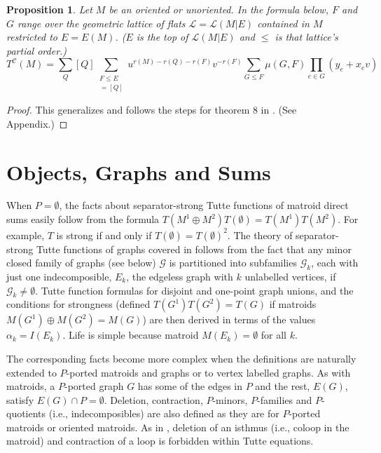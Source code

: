 \documentclass[12pt,leqno]{amsart}
\newtheorem{prop}[lem]{Proposition}
\theoremstyle{remark}
\begin{document}
\begin{prop}
\label{GFlatProp}
Let $M$ be an oriented or unoriented.
In the formula below,
$F$ and $G$ range over the geometric lattice of flats 
$\mathcal{L}=\mathcal{L}(M|E)$ contained
in $M$ restricted to $E = E(M)$.  
($E$ is the top of $\mathcal{L}(M|E)$ and $\le$
is that lattice's partial order.)
\[
T^{\mathcal{C}}(M) = \sum_{Q} [Q]
      \sum_{\substack{F\leq E\\
                     [M/F|P]=[Q]
           }}
                   u^{r(M)-r(Q)-r(F)}
                   v^{-r(F)}
                   \sum_{G\le F}
                   \mu(G,F)
                   \prod_{e\in G}
                    (y_e+x_ev)
\]
\end{prop}

\begin{proof}
This 
generalizes and 
follows the steps for theorem 8 in \cite{sdcPorted}.  (See Appendix.)
\end{proof}

\part{Objects, Graphs and Sums}


When $P=\emptyset$, the facts about separator-strong Tutte functions
of matroid direct sums easily follow from the formula
$T(M^1\oplus M^2)T(\emptyset)=T(M^1)T(M^2)$.  For example,
$T$ is strong if and only if $T(\emptyset)=T(\emptyset)^2$.
The theory of separator-strong Tutte functions of graphs covered
in \cite{Ellis-Monaghan-Traldi}  follows from the fact that any
minor closed family of graphs (see below) $\mathcal{G}$ is partitioned into
subfamilies $\mathcal{G}_k$, each with just one indecomposible,
$E_k$, the edgeless graph with $k$ unlabelled vertices, 
if $\mathcal{G}_k\neq\emptyset$.
Tutte function formulas for disjoint and one-point graph unions, 
and the conditions for strongness (defined $T(G^1)T(G^2)=T(G)$ if
matroids $M(G^1)\oplus M(G^2)=M(G)$) are then 
derived \cite{Ellis-Monaghan-Traldi}
in terms of the values $\alpha_k=I(E_k)$.  Life is simple because
matroid $M(E_k)=\emptyset$ for all $k$.

The corresponding facts become more complex when the definitions
are naturally extended to $P$-ported matroids and graphs
or to vertex labelled graphs.  As with
matroids, a $P$-ported graph $G$ has some of the edges in $P$ and the rest,
$E(G)$, satisfy $E(G)\cap P=\emptyset$.  Deletion, contraction,
$P$-minors, $P$-families and $P$-quotients (i.e., indecomposibles)
are also defined as they are for $P$-ported matroids or oriented matroids.
As in \cite{Ellis-Monaghan-Traldi},
deletion of an isthmus (i.e., coloop in the matroid) and
contraction of a loop is forbidden within Tutte equations.
\end{document}
